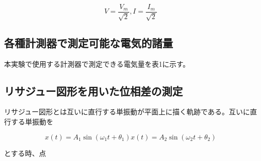 \documentclass[dvipdfmx]{jsarticle}
\begin{document}
\begin{equation}
V = \frac{V_m}{\sqrt{2}}, I = \frac{I_m}{\sqrt2}
\end{equation}

\subsection{各種計測器で測定可能な電気的諸量}

本実験で使用する計測器で測定できる電気量を表1に示す。

\subsection{リサジュー図形を用いた位相差の測定}

リサジュー図形とは互いに直行する単振動が平面上に描く軌跡である。互いに直行する単振動を

\begin{equation}
	x(t) = A_1\sin(\omega_1 t + \theta_1) 
	x(t) = A_2\sin(\omega_2 t + \theta_2) 
\end{equation}

とする時、点
\end{document}
